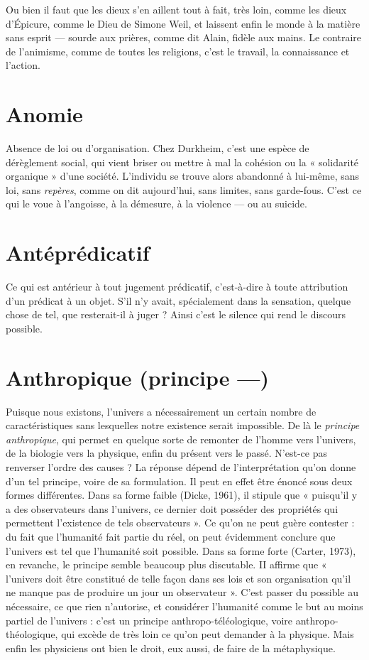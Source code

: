 Ou bien il faut que les dieux s’en aillent tout à fait, très loin, comme les
dieux d’Épicure, comme le Dieu de Simone Weil, et laissent enfin le monde à
la matière sans esprit — sourde aux prières, comme dit Alain, fidèle aux mains.
Le contraire de l’animisme, comme de toutes les religions, c’est le travail, la
connaissance et l’action.

\section{Anomie}
Absence de loi ou d'organisation. Chez Durkheim, c’est une espèce
de dérèglement social, qui vient briser ou mettre à mal la cohésion
ou la « solidarité organique » d’une société. L’individu se trouve alors abandonné
à lui-même, sans loi, sans {\it repères}, comme on dit aujourd’hui, sans
limites, sans garde-fous. C’est ce qui le voue à l’angoisse, à la démesure, à la violence —
ou au suicide.

\section{Antéprédicatif}
Ce qui est antérieur à tout jugement prédicatif, c’est-à-dire
à toute attribution d’un prédicat à un objet. S'il
n’y avait, spécialement dans la sensation, quelque chose de tel, que resterait-il à
juger ? Ainsi c’est le silence qui rend le discours possible.

\section{Anthropique (principe —)}
Puisque nous existons, l'univers a nécessairement
un certain nombre de caractéristiques
sans lesquelles notre existence serait impossible. De là le {\it principe anthropique},
qui permet en quelque sorte de remonter de l’homme vers l'univers, de
la biologie vers la physique, enfin du présent vers le passé. N'est-ce pas renverser
l’ordre des causes ? La réponse dépend de l'interprétation qu’on donne
d’un tel principe, voire de sa formulation. Il peut en effet être énoncé sous deux
formes différentes. Dans sa forme faible (Dicke, 1961), il stipule que « puisqu’il
y a des observateurs dans l’univers, ce dernier doit posséder des propriétés
qui permettent l'existence de tels observateurs ». Ce qu'on ne peut guère
contester : du fait que l'humanité fait partie du réel, on peut évidemment
conclure que l’univers est tel que l'humanité soit possible. Dans sa forme forte
(Carter, 1973), en revanche, le principe semble beaucoup plus discutable. II
affirme que « l'univers doit être constitué de telle façon dans ses lois et son
organisation qu’il ne manque pas de produire un jour un observateur ». C’est
passer du possible au nécessaire, ce que rien n’autorise, et considérer l'humanité
comme le but au moins partiel de l’univers : c’est un principe anthropo-téléologique,
voire anthropo-théologique, qui excède de très loin ce qu’on peut
demander à la physique. Mais enfin les physiciens ont bien le droit, eux aussi,
de faire de la métaphysique.


